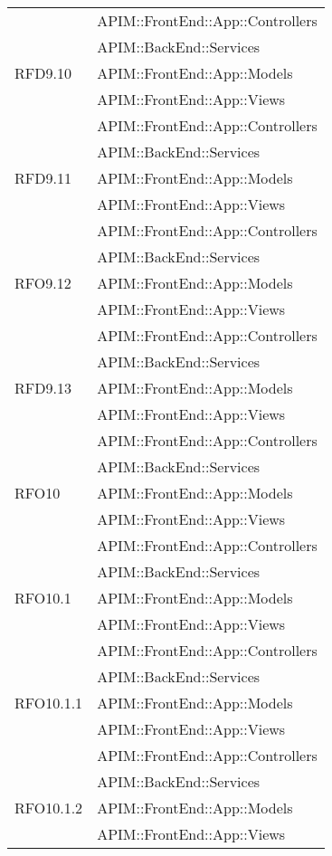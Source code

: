 \begin{longtable}{ p{4cm} | p{12cm} }
			& APIM::FrontEnd::App::Controllers \\
			& APIM::BackEnd::Services \\
			\hline		
			RFD9.10
			& APIM::FrontEnd::App::Models \\
			& APIM::FrontEnd::App::Views \\
			& APIM::FrontEnd::App::Controllers \\
			& APIM::BackEnd::Services \\
			\hline		
			RFD9.11
			& APIM::FrontEnd::App::Models \\
			& APIM::FrontEnd::App::Views \\
			& APIM::FrontEnd::App::Controllers \\
			& APIM::BackEnd::Services \\
			\hline		
			RFO9.12
			& APIM::FrontEnd::App::Models \\
			& APIM::FrontEnd::App::Views \\
			& APIM::FrontEnd::App::Controllers \\
			& APIM::BackEnd::Services \\
			\hline		
			RFD9.13
			& APIM::FrontEnd::App::Models \\
			& APIM::FrontEnd::App::Views \\
			& APIM::FrontEnd::App::Controllers \\
			& APIM::BackEnd::Services \\
			\hline	
			RFO10
			& APIM::FrontEnd::App::Models \\
			& APIM::FrontEnd::App::Views \\
			& APIM::FrontEnd::App::Controllers \\
			& APIM::BackEnd::Services \\
			\hline	
			RFO10.1
			& APIM::FrontEnd::App::Models \\
			& APIM::FrontEnd::App::Views \\
			& APIM::FrontEnd::App::Controllers \\
			& APIM::BackEnd::Services \\
			\hline	
			RFO10.1.1
			& APIM::FrontEnd::App::Models \\
			& APIM::FrontEnd::App::Views \\
			& APIM::FrontEnd::App::Controllers \\
			& APIM::BackEnd::Services \\
			\hline	
			RFO10.1.2
			& APIM::FrontEnd::App::Models \\
			& APIM::FrontEnd::App::Views \\

\end{longtable}
